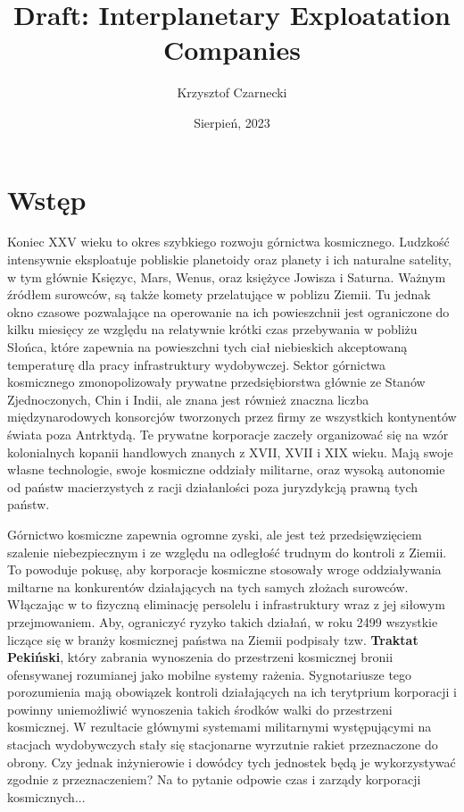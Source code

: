 \documentclass[11pt,a4paper]{article}
\begin{document}
\title{Draft: Interplanetary Exploatation Companies}
\author{Krzysztof Czarnecki}
\date{Sierpień, 2023}
\maketitle

\section{Wstęp}

Koniec XXV wieku to okres szybkiego rozwoju górnictwa kosmicznego. Ludzkość intensywnie eksploatuje pobliskie planetoidy oraz planety i ich naturalne satelity, w tym głównie Księzyc, Mars, Wenus, oraz księżyce Jowisza i Saturna. Ważnym źródłem surowców, są także komety przelatujące w poblizu Ziemii. Tu jednak okno czasowe pozwalające na operowanie na ich powieszchnii jest ograniczone do kilku miesięcy ze względu na relatywnie krótki czas przebywania w pobliżu Słońca, które zapewnia na powieszchni tych ciał niebieskich akceptowaną temperaturę dla pracy infrastruktury wydobywczej. Sektor górnictwa kosmicznego zmonopolizowały prywatne przedsiębiorstwa głównie ze Stanów Zjednoczonych, Chin i Indii, ale znana jest również znaczna liczba międzynarodowych konsorcjów tworzonych przez firmy ze wszystkich kontynentów świata poza Antrktydą. Te prywatne korporacje zaczeły organizować się na wzór kolonialnych kopanii handlowych znanych z XVII, XVII i XIX wieku. Mają swoje własne technologie, swoje kosmiczne oddziały militarne, oraz wysoką autonomie od państw macierzystych z racji działanlości poza juryzdykcją prawną tych państw.  

Górnictwo kosmiczne zapewnia ogromne zyski, ale jest też przedsięwzięciem szalenie niebezpiecznym i ze względu na odległość trudnym do kontroli z Ziemii. To powoduje pokusę, aby korporacje kosmiczne stosowały wroge oddziaływania miltarne na konkurentów działających na tych samych złożach surowców. Włączając w to fizyczną eliminację persolelu i infrastruktury wraz z jej siłowym przejmowaniem. Aby, ograniczyć ryzyko takich działań, w roku 2499 wszystkie liczące się w branży kosmicznej państwa na Ziemii podpisały tzw. \textbf{Traktat Pekiński}, który zabrania wynoszenia do przestrzeni kosmicznej bronii ofensywanej rozumianej jako mobilne systemy rażenia. Sygnotariusze tego porozumienia mają obowiązek kontroli działających na ich terytprium korporacji i powinny uniemożliwić wynoszenia takich środków walki do przestrzeni kosmicznej. W rezultacie głównymi systemami militarnymi występującymi na stacjach wydobywczych stały się stacjonarne wyrzutnie rakiet przeznaczone do obrony. Czy jednak inżynierowie i dowódcy tych jednostek będą je wykorzystywać zgodnie z przeznaczeniem? Na to pytanie odpowie czas i zarządy korporacji kosmicznych...
\newpage
\end{document}
